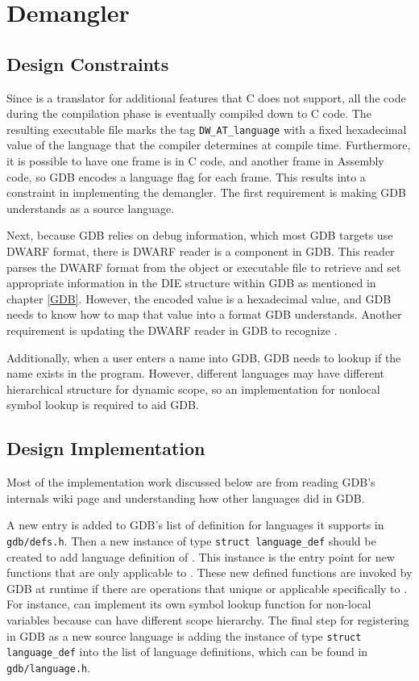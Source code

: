 \chapter{\CFAS Demangler} \label{demangler}

\section{Design Constraints}
Since \CFAS is a translator for additional features that C does not support, all
the code during the compilation phase is eventually compiled down to C code.
The resulting executable file marks the tag \verb|DW_AT_language| with a
fixed hexadecimal value of the language that the compiler determines at compile
time. Furthermore, it is possible to have one frame is in C code, and another
frame in Assembly code, so GDB encodes a language flag for each frame. This
results into a constraint in implementing the demangler. The first requirement is
making GDB understands \CFAS as a source language.

Next, because GDB relies on debug information, which most GDB targets use DWARF
format, there is DWARF reader is a component in GDB. This reader parses the DWARF format from the object or
executable file to retrieve and set
appropriate information in the DIE structure within GDB as mentioned in chapter
\ref{GDB}. However, the encoded value is a hexadecimal value, and GDB needs to
know how to map that value into a format GDB understands.
Another requirement is updating the DWARF reader in GDB to recognize \CFA.

Additionally, when a user enters a name into GDB, GDB needs to lookup if the
name exists in the program. However, different languages may have different
hierarchical structure for dynamic scope, so an implementation for nonlocal
symbol lookup is required to aid GDB.

\section{Design Implementation}
Most of the implementation work discussed below are from reading GDB's internals
wiki page and understanding how other languages did in GDB\cite{reference}.

A new entry is added to GDB's list of definition for languages it supports in
\verb|gdb/defs.h|. Then a new instance of type \verb|struct language_def|
should be created to add language definition of \CFAS. This instance is the
entry point for new functions that are only applicable to \CFA. These new
defined functions are invoked by GDB at runtime if there are operations that
unique or applicable specifically to \CFA. For instance, \CFAS can implement its
own symbol lookup function for non-local variables because \CFAS can have
different scope hierarchy. The final step for registering \CFAS in GDB as a new
source language is adding the instance of type \verb|struct language_def| into
the list of language definitions, which can be found in
\verb|gdb/language.h|.

